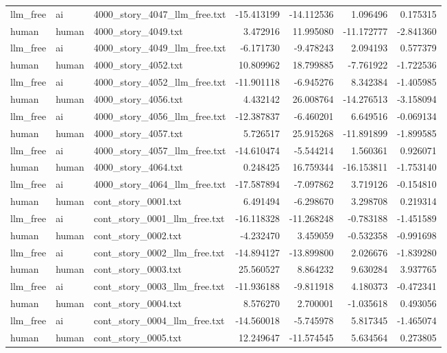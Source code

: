 \begin{longtable}{lllrrrr}
llm\_free & ai & 4000\_story\_4047\_llm\_free.txt & -15.413199 & -14.112536 & 1.096496 & 0.175315 \\
human & human & 4000\_story\_4049.txt & 3.472916 & 11.995080 & -11.172777 & -2.841360 \\
llm\_free & ai & 4000\_story\_4049\_llm\_free.txt & -6.171730 & -9.478243 & 2.094193 & 0.577379 \\
human & human & 4000\_story\_4052.txt & 10.809962 & 18.799885 & -7.761922 & -1.722536 \\
llm\_free & ai & 4000\_story\_4052\_llm\_free.txt & -11.901118 & -6.945276 & 8.342384 & -1.405985 \\
human & human & 4000\_story\_4056.txt & 4.432142 & 26.008764 & -14.276513 & -3.158094 \\
llm\_free & ai & 4000\_story\_4056\_llm\_free.txt & -12.387837 & -6.460201 & 6.649516 & -0.069134 \\
human & human & 4000\_story\_4057.txt & 5.726517 & 25.915268 & -11.891899 & -1.899585 \\
llm\_free & ai & 4000\_story\_4057\_llm\_free.txt & -14.610474 & -5.544214 & 1.560361 & 0.926071 \\
human & human & 4000\_story\_4064.txt & 0.248425 & 16.759344 & -16.153811 & -1.753140 \\
llm\_free & ai & 4000\_story\_4064\_llm\_free.txt & -17.587894 & -7.097862 & 3.719126 & -0.154810 \\
human & human & cont\_story\_0001.txt & 6.491494 & -6.298670 & 3.298708 & 0.219314 \\
llm\_free & ai & cont\_story\_0001\_llm\_free.txt & -16.118328 & -11.268248 & -0.783188 & -1.451589 \\
human & human & cont\_story\_0002.txt & -4.232470 & 3.459059 & -0.532358 & -0.991698 \\
llm\_free & ai & cont\_story\_0002\_llm\_free.txt & -14.894127 & -13.899800 & 2.026676 & -1.839280 \\
human & human & cont\_story\_0003.txt & 25.560527 & 8.864232 & 9.630284 & 3.937765 \\
llm\_free & ai & cont\_story\_0003\_llm\_free.txt & -11.936188 & -9.811918 & 4.180373 & -0.472341 \\
human & human & cont\_story\_0004.txt & 8.576270 & 2.700001 & -1.035618 & 0.493056 \\
llm\_free & ai & cont\_story\_0004\_llm\_free.txt & -14.560018 & -5.745978 & 5.817345 & -1.465074 \\
human & human & cont\_story\_0005.txt & 12.249647 & -11.574545 & 5.634564 & 0.273805 \\

\end{longtable}
